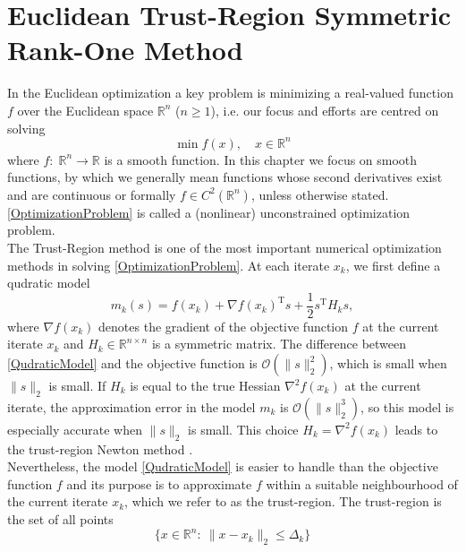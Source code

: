 \chapter{Euclidean Trust-Region Symmetric Rank-One Method}

In the Euclidean optimization a key problem is minimizing a real-valued function $f$ over the Euclidean space $\mathbb{R}^n$ ($n \geq 1$), i.e. our focus and efforts are centred on solving 
\begin{equation}\label{OptimizationProblem}
    \min f(x), \quad x \in \mathbb{R}^n
\end{equation}  
where $f \colon \; \mathbb{R}^n \to \mathbb{R}$ is a smooth function. In this chapter we focus on smooth functions, by which we generally mean functions whose second derivatives exist and are continuous or formally $f \in C^2(\mathbb{R}^n)$, unless otherwise stated. \cref{OptimizationProblem} is called a (nonlinear) unconstrained optimization problem. \\
The Trust-Region method is one of the most important numerical optimization methods in solving \cref{OptimizationProblem}. At each iterate $x_k$, we first define a qudratic model 
\begin{equation}\label{QudraticModel}
    m_k(s) = f(x_k) + \nabla f(x_k)^{\mathrm{T}} s + \frac{1}{2} s^{\mathrm{T}} H_k s,
\end{equation}
where $\nabla f(x_k)$ denotes the gradient of the objective function $f$ at the current iterate $x_k$ and $H_k \in  \mathbb{R}^{n \times n}$ is a symmetric matrix. The difference between \cref{QudraticModel} and the objective function is $\mathcal{O}(\lVert s \rVert^{2}_2)$, which is small when $\lVert s \rVert_2$ is small. If $H_k$ is equal to the true Hessian $\nabla^2 f(x_k)$ at the current iterate, the approximation error in the model $m_k$ is $\mathcal{O}(\lVert s \rVert^{3}_2)$, so this model is especially accurate when $\lVert s \rVert_2$ is small. This choice $H_k = \nabla^2 f(x_k)$ leads to the trust-region Newton method \cite[p.~68]{NocedalWright:2006}. \\
Nevertheless, the model \cref{QudraticModel} is easier to handle than the objective function $f$ and its purpose is to approximate $f$ within a suitable neighbourhood of the current iterate $x_k$, which we refer to as the trust-region. The trust-region is the set of all points
\begin{equation}\label{TrustRegion}
    \{ x \in \mathbb{R}^n \colon \ \lVert x - x_k \rVert_2 \leq \Delta_k \}
\end{equation}
